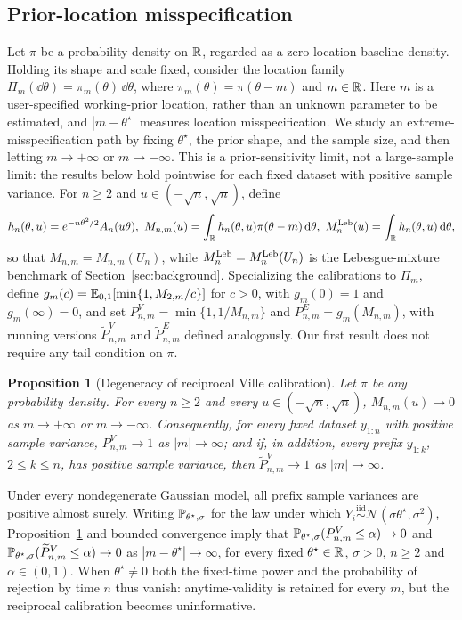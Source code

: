 \documentclass{article}
\newtheorem{proposition}{Proposition}
\newcommand{\iid}{\stackrel{\mathrm{iid}}{\sim}}
\begin{document}
\subsection{Prior-location misspecification}
\label{subsec:location-misspecification}
\vspace{-4pt}
Let $\pi$ be a probability density on $\mathbb{R}$, regarded as a zero-location
baseline density. Holding its shape and scale fixed, consider the
location family $\Pi_m(\dd\theta)=\pi_m(\theta)\,\dd\theta$, where
$\pi_m(\theta)=\pi(\theta-m)$ and $m\in\mathbb{R}$. Here $m$ is a user-specified
working-prior location, rather than an unknown parameter to be estimated,
and $|m-\theta^\star|$ measures location misspecification. We study an
extreme-misspecification path by fixing $\theta^\star$, the prior shape,
and the sample size, and then letting $m\to+\infty$ or $m\to-\infty$.
This is a prior-sensitivity limit, not a large-sample limit: the results
below hold pointwise for each fixed dataset with positive sample
variance. For $n\geq2$ and $u\in(-\sqrt n,\sqrt n)$, define
\vspace{-4pt}
\begin{equation}
\label{eq:hnu-def}
  h_n(\theta,u)=e^{-n\theta^2/2}A_n(u\theta),
  \ 
  M_{n,m}(u)=\int_\R h_n(\theta,u)\pi(\theta-m)\,\dd\theta,
  \ 
  M_n^{\Leb}(u)=\int_\R h_n(\theta,u)\,\dd\theta,
\end{equation}
so that $M_{n,m}=M_{n,m}(U_n)$, while $M_n^{\mathrm{Leb}}=M_n^{\mathrm{Leb}}(U_n)$ is the
Lebesgue-mixture benchmark of Section~\ref{sec:background}. Specializing
the calibrations to $\Pi_m$, define
$g_m(c)=\mathbb{E}_{0,1}[\min\{1,M_{2,m}/c\}]$ for $c>0$, with $g_m(0)=1$ and
$g_m(\infty)=0$, and set $P_{n,m}^V=\min\{1,1/M_{n,m}\}$ and
$P_{n,m}^E=g_m(M_{n,m})$, with running versions
$\widetilde P_{n,m}^V$ and $\widetilde P_{n,m}^E$ defined analogously.
Our first result does not require any tail condition on $\pi$.

\begin{proposition}[Degeneracy of reciprocal Ville calibration]
\label{prop:ville-degeneracy}
Let $\pi$ be any probability density. For every $n\geq2$ and every
$u\in(-\sqrt n,\sqrt n)$, $M_{n,m}(u)\to0$ as $m\to+\infty$ or
$m\to-\infty$. Consequently, for every fixed dataset $y_{1:n}$ with
positive sample variance, $P_{n,m}^V\to1$ as $|m|\to\infty$; and if, in
addition, every prefix $y_{1:k}$, $2\leq k\leq n$, has positive sample
variance, then $\widetilde P_{n,m}^V\to1$ as $|m|\to\infty$.
\end{proposition}

Under every nondegenerate Gaussian model, all prefix sample variances are
positive almost surely. Writing $\mathbb{P}_{\theta^\star,\sigma}$ for the law
under which $Y_i\iid\mathcal N(\sigma\theta^\star,\sigma^2)$,
Proposition~\ref{prop:ville-degeneracy} and bounded convergence imply
that $\mathbb{P}_{\theta^\star,\sigma}(P_{n,m}^V\leq\alpha)\to0$ and
$\mathbb{P}_{\theta^\star,\sigma}(\widetilde P_{n,m}^V\leq\alpha)\to0$ as
$|m-\theta^\star|\to\infty$, for every fixed $\theta^\star\in\mathbb{R}$,
$\sigma>0$, $n\geq2$ and $\alpha\in(0,1)$. When $\theta^\star\neq0$ both
the fixed-time power and the probability of rejection by time $n$ thus
vanish: anytime-validity is retained for every $m$, but the reciprocal
calibration becomes uninformative.
\vspace{-4pt}
\end{document}
